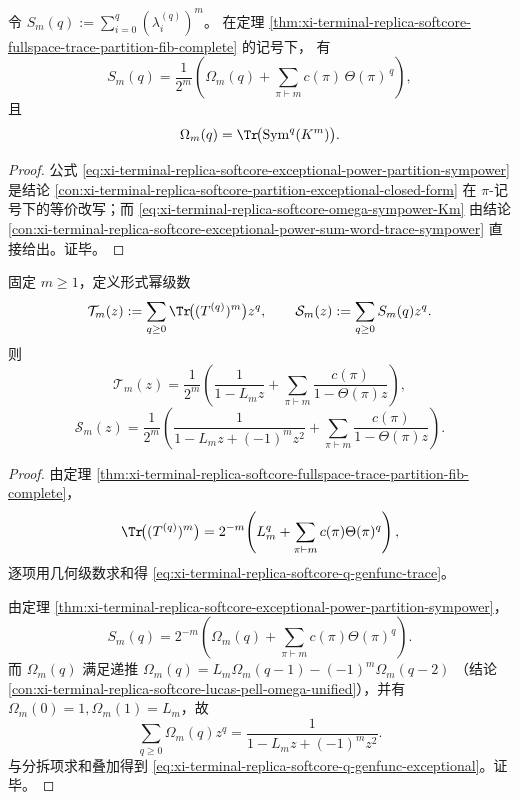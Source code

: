 \begin{theorem}[例外谱幂和的分拆闭式与对称幂表征]\label{thm:xi-terminal-replica-softcore-exceptional-power-partition-sympower}
令
\(
S_m(q):=\sum_{i=0}^{q}(\lambda_i^{(q)})^m
\)。
在定理 \ref{thm:xi-terminal-replica-softcore-fullspace-trace-partition-fib-complete} 的记号下，
有
\begin{equation}\label{eq:xi-terminal-replica-softcore-exceptional-power-partition-sympower}
S_m(q)=\frac1{2^m}\left(
\Omega_m(q)+\sum_{\pi\vdash m}c(\pi)\,\Theta(\pi)^{\,q}
\right),
\end{equation}
且
\begin{equation}\label{eq:xi-terminal-replica-softcore-omega-sympower-Km}
\Omega_m(q)=\Tr\!\bigl(\operatorname{Sym}^q(K^m)\bigr).
\end{equation}
\end{theorem}
\begin{proof}
公式 \eqref{eq:xi-terminal-replica-softcore-exceptional-power-partition-sympower}
是结论 \ref{con:xi-terminal-replica-softcore-partition-exceptional-closed-form}
在 \(\pi\)-记号下的等价改写；而
\eqref{eq:xi-terminal-replica-softcore-omega-sympower-Km}
由结论
\ref{con:xi-terminal-replica-softcore-exceptional-power-sum-word-trace-sympower}
直接给出。证毕。
\end{proof}

\begin{theorem}\label{thm:xi-terminal-replica-softcore-q-genfunc-rational-partition}
固定 \(m\ge 1\)，定义形式幂级数
\[
\mathcal T_m(z):=\sum_{q\ge 0}\Tr\!\bigl((T^{(q)})^m\bigr)z^q,
\qquad
\mathcal S_m(z):=\sum_{q\ge 0}S_m(q)z^q.
\]
则
\begin{equation}\label{eq:xi-terminal-replica-softcore-q-genfunc-trace}
\mathcal T_m(z)
=\frac1{2^m}\left(
\frac{1}{1-L_m z}
+\sum_{\pi\vdash m}\frac{c(\pi)}{1-\Theta(\pi)z}
\right),
\end{equation}
\begin{equation}\label{eq:xi-terminal-replica-softcore-q-genfunc-exceptional}
\mathcal S_m(z)
=\frac1{2^m}\left(
\frac{1}{1-L_m z+(-1)^m z^2}
+\sum_{\pi\vdash m}\frac{c(\pi)}{1-\Theta(\pi)z}
\right).
\end{equation}
\end{theorem}
\begin{proof}
由定理 \ref{thm:xi-terminal-replica-softcore-fullspace-trace-partition-fib-complete}，
\[
\Tr\!\bigl((T^{(q)})^m\bigr)
=2^{-m}\!\left(L_m^q+\sum_{\pi\vdash m}c(\pi)\Theta(\pi)^q\right),
\]
逐项用几何级数求和得 \eqref{eq:xi-terminal-replica-softcore-q-genfunc-trace}。

由定理 \ref{thm:xi-terminal-replica-softcore-exceptional-power-partition-sympower}，
\[
S_m(q)=2^{-m}\!\left(\Omega_m(q)+\sum_{\pi\vdash m}c(\pi)\Theta(\pi)^q\right).
\]
而 \(\Omega_m(q)\) 满足递推
\(
\Omega_m(q)=L_m\Omega_m(q-1)-(-1)^m\Omega_m(q-2)
\)
（结论 \ref{con:xi-terminal-replica-softcore-lucas-pell-omega-unified}），并有
\(\Omega_m(0)=1,\Omega_m(1)=L_m\)，故
\[
\sum_{q\ge 0}\Omega_m(q)z^q=\frac{1}{1-L_m z+(-1)^m z^2}.
\]
与分拆项求和叠加得到 \eqref{eq:xi-terminal-replica-softcore-q-genfunc-exceptional}。证毕。
\end{proof}

